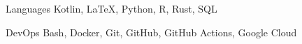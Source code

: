 

\begin{cvpairs}

  
\cvpair
    {Languages} %
    {Kotlin, LaTeX, Python, R, Rust, SQL} %


\cvpair
    {DevOps} %
    {Bash, Docker, Git, GitHub, GitHub Actions, Google Cloud} %

\end{cvpairs}